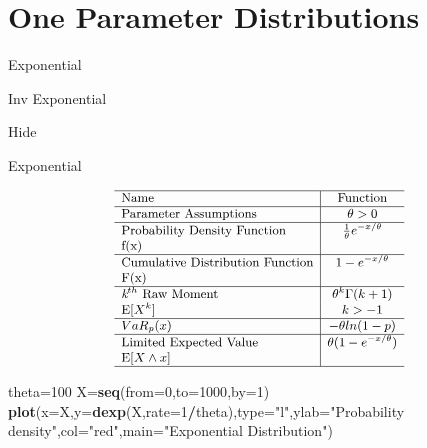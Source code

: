 \documentclass[]{book}
\newenvironment{Shaded}{\begin{snugshade}}{\end{snugshade}}
\newcommand{\KeywordTok}[1]{\textcolor[rgb]{0.13,0.29,0.53}{\textbf{#1}}}
\newcommand{\DataTypeTok}[1]{\textcolor[rgb]{0.13,0.29,0.53}{#1}}
\newcommand{\DecValTok}[1]{\textcolor[rgb]{0.00,0.00,0.81}{#1}}
\newcommand{\StringTok}[1]{\textcolor[rgb]{0.31,0.60,0.02}{#1}}
\newcommand{\OperatorTok}[1]{\textcolor[rgb]{0.81,0.36,0.00}{\textbf{#1}}}
\newcommand{\NormalTok}[1]{#1}
\begin{document}
\section{One Parameter Distributions}\label{one-parameter-distributions}

Exponential

Inv Exponential

\hypertarget{1pA}{}
{Hide}

Exponential

\[
{\small
\begin{matrix}
\begin{array}{l|c}
\hline
  \text{Name} & \text{Function} \\
\hline
  \text{Parameter Assumptions} & \theta>0 \\
\hline
  \text{Probability Density Function} & \frac{1}{\theta}e^{-x/\theta} \\
    \text{f(x)} & \\
\hline
  \text{Cumulative Distribution Function} & 1-e^{-x/\theta} \\
    \text{F(x)} & \\
\hline
 \textit{k}^{th}~\text{Raw Moment}  & \theta^k\Gamma(k+1) \\
  \mathrm{E}[X^k]  & k>-1 \\
\hline
  VaR_p(x) & -\theta ln(1-p) \\
\hline
  \text{Limited Expected Value} & \theta(1-e^{-x/\theta}) \\
  \mathrm{E}[X\wedge x] & \\
\hline
\end{array}
\end{matrix}
}
\]

\begin{Shaded}
\begin{Highlighting}[]
\NormalTok{theta=}\DecValTok{100}
\NormalTok{X=}\KeywordTok{seq}\NormalTok{(}\DataTypeTok{from=}\DecValTok{0}\NormalTok{,}\DataTypeTok{to=}\DecValTok{1000}\NormalTok{,}\DataTypeTok{by=}\DecValTok{1}\NormalTok{)}
\KeywordTok{plot}\NormalTok{(}\DataTypeTok{x=}\NormalTok{X,}\DataTypeTok{y=}\KeywordTok{dexp}\NormalTok{(X,}\DataTypeTok{rate=}\DecValTok{1}\OperatorTok{/}\NormalTok{theta),}\DataTypeTok{type=}\StringTok{"l"}\NormalTok{,}\DataTypeTok{ylab=}\StringTok{"Probability density"}\NormalTok{,}\DataTypeTok{col=}\StringTok{"red"}\NormalTok{,}\DataTypeTok{main=}\StringTok{"Exponential Distribution"}\NormalTok{)}
\end{Highlighting}
\end{Shaded}
\end{document}
